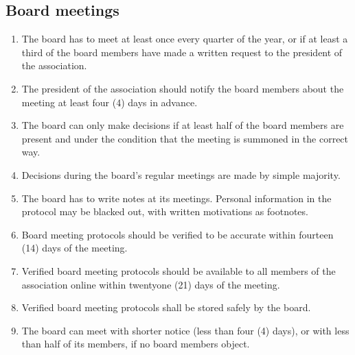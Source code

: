 \subsection{Board meetings}
\begin{enumerate}
  \item The board has to meet at least once every quarter of the year, or if at least a third of the board members have made a written request to the president of the association.
  \item The president of the association should notify the board members about the meeting at least four (4) days in advance.
  \item The board can only make decisions if at least half of the board members are present and under the condition that the meeting is summoned in the correct way.
  \item Decisions during the board's regular meetings are made by simple majority.
  \item The board has to write notes at its meetings. Personal information in the protocol may be blacked out, with written motivations as footnotes.
  \item Board meeting protocols should be verified to be accurate within fourteen (14) days of the meeting.
  \item Verified board meeting protocols should be available to all members of the association online within twentyone (21) days of the  meeting.
  \item Verified board meeting protocols shall be stored safely by the board.
  \item The board can meet with shorter notice (less than four (4) days), or with less than half of its members, if no board members object. 
\end{enumerate}

